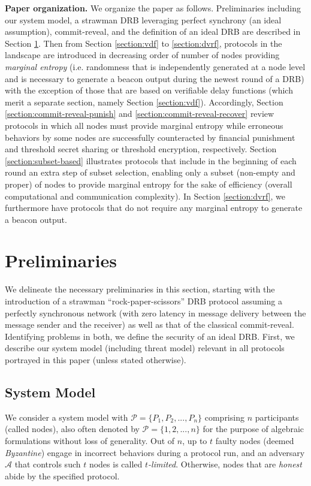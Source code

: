 \documentclass[letterpaper,twocolumn,10pt]{article}
\theoremstyle{definition}
\theoremstyle{remark}
\begin{document}
\textbf{Paper organization.} We organize the paper as follows. Preliminaries including our system model, a strawman DRB leveraging perfect synchrony (an ideal assumption), commit-reveal, and the definition of an ideal DRB are described in Section \ref{section:preliminaries}. Then from Section \ref{section:vdf} to \ref{section:dvrf}, protocols in the landscape are introduced in decreasing order of number of nodes providing \textit{marginal entropy} (i.e. randomness that is independently generated at a node level and is necessary to generate a beacon output during the newest round of a DRB) with the exception of those that are based on verifiable delay functions (which merit a separate section, namely Section \ref{section:vdf}). Accordingly, Section \ref{section:commit-reveal-punish} and \ref{section:commit-reveal-recover} review protocols in which all nodes must provide marginal entropy while erroneous behaviors by some nodes are successfully counteracted by financial punishment and threshold secret sharing or threshold encryption, respectively. Section \ref{section:subset-based} illustrates protocols that include in the beginning of each round an extra step of subset selection, enabling only a subset (non-empty and proper) of nodes to provide marginal entropy for the sake of efficiency (overall computational and communication complexity). In Section \ref{section:dvrf}, we furthermore have protocols that do not require any marginal entropy to generate a beacon output.

\section{Preliminaries}
\label{section:preliminaries}
We delineate the necessary preliminaries in this section, starting with the introduction of a strawman ``rock-paper-scissors'' DRB protocol assuming a perfectly synchronous network (with zero latency in message delivery between the message sender and the receiver) as well as that of the classical commit-reveal. Identifying problems in both, we define the security of an ideal DRB. First, we describe our system model (including threat model) relevant in all protocols portrayed in this paper (unless stated otherwise).

\subsection{System Model}
We consider a system model with $\mathcal{P} = \{P_1, P_2, ..., P_n\}$ comprising $n$ participants (called nodes), also often denoted by $\mathcal{P} = \{1, 2, ..., n\}$ for the purpose of algebraic formulations without loss of generality. Out of $n$, up to $t$ faulty nodes (deemed \textit{Byzantine}) engage in incorrect behaviors during a protocol run, and an adversary $\mathcal{A}$ that controls such $t$ nodes is called \textit{$t$-limited}. Otherwise, nodes that are \textit{honest} abide by the specified protocol.
\end{document}
